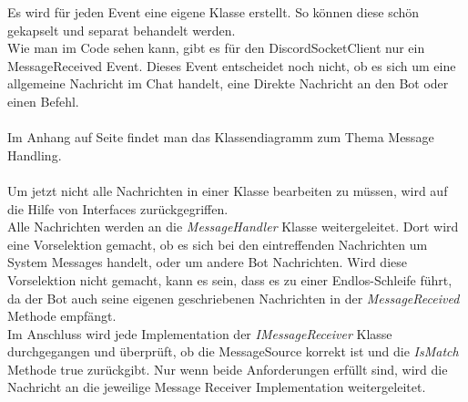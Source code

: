 \documentclass[a4paper, table]{article}
\begin{document}
Es wird für jeden Event eine eigene Klasse erstellt.
So können diese schön gekapselt und separat behandelt werden.\\
Wie man im Code sehen kann, gibt es für den DiscordSocketClient nur ein MessageReceived Event.
Dieses Event entscheidet noch nicht, ob es sich um eine allgemeine Nachricht im Chat handelt, 
eine Direkte Nachricht an den Bot oder einen Befehl.\\\\
Im Anhang auf Seite \pageref*{fig:message-handling} findet man das Klassendiagramm zum Thema Message Handling.\\\\
Um jetzt nicht alle Nachrichten in einer Klasse bearbeiten zu müssen, wird auf die Hilfe von Interfaces zurückgegriffen.\\
Alle Nachrichten werden an die \textit{MessageHandler} Klasse weitergeleitet.
Dort wird eine Vorselektion gemacht, ob es sich bei den eintreffenden Nachrichten um System Messages handelt, oder um andere Bot Nachrichten.
Wird diese Vorselektion nicht gemacht, kann es sein, dass es zu einer Endlos-Schleife führt, 
da der Bot auch seine eigenen geschriebenen Nachrichten in der \textit{MessageReceived} Methode empfängt.\\
Im Anschluss wird jede Implementation der \textit{IMessageReceiver} Klasse durchgegangen und überprüft,
ob die MessageSource korrekt ist und die \textit{IsMatch} Methode true zurückgibt.
Nur wenn beide Anforderungen erfüllt sind, wird die Nachricht an die jeweilige Message Receiver Implementation weitergeleitet.
\end{document}

